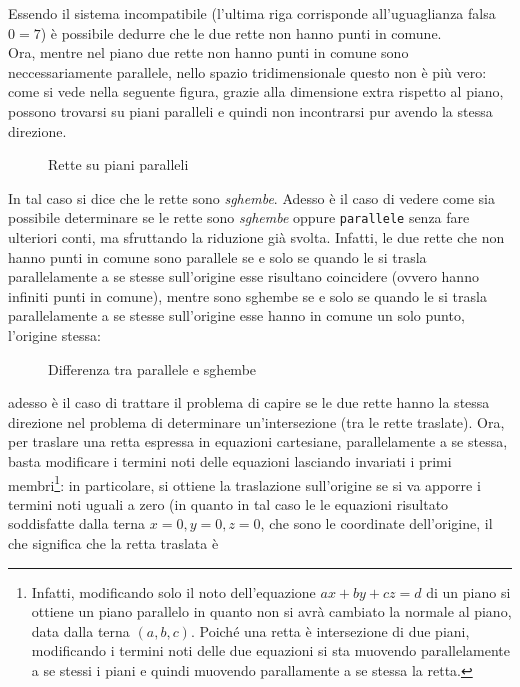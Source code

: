 Essendo il sistema incompatibile (l'ultima riga corrisponde all'uguaglianza falsa $0=7$) è possibile
dedurre che le due rette non hanno punti in comune.\\
Ora, mentre nel piano due rette non hanno punti in comune sono neccessariamente parallele, nello spazio
tridimensionale questo non è più vero: come si vede nella seguente figura, grazie alla dimensione extra
rispetto al piano, possono trovarsi su piani paralleli e quindi non incontrarsi pur avendo la stessa
direzione.
\clearpage
\begin{figure}[ht!]
  \centering
  
  \caption{Rette su piani paralleli}
  \label{fig:rettpar}
\end{figure}

In tal caso si dice che le rette sono \textit{sghembe}. Adesso è il caso di vedere come sia possibile
determinare se le rette sono \textit{sghembe} oppure \texttt{parallele} senza fare ulteriori conti, 
ma sfruttando la riduzione già svolta. Infatti, le due rette che non hanno punti in comune sono
parallele se e solo se quando le si trasla parallelamente a se stesse sull'origine esse risultano
coincidere (ovvero hanno infiniti punti in comune), mentre sono sghembe se e solo se quando le
si trasla parallelamente a se stesse sull'origine esse hanno in comune un solo punto, l'origine stessa:
\begin{figure}[ht!]
  \centering
  
  \caption{Differenza tra parallele e sghembe}
  \label{fig:retteparesghembe}
\end{figure}
adesso è il caso di trattare il problema di capire se le due rette hanno
la stessa direzione nel problema di determinare un'intersezione (tra le
rette traslate). Ora, per traslare una retta espressa in equazioni
cartesiane, parallelamente a se stessa, basta modificare i termini noti
delle equazioni lasciando invariati i primi membri\footnote{Infatti,
  modificando solo il noto dell'equazione $ax+by+cz=d$ di un piano si
  ottiene un piano parallelo in quanto non si avrà cambiato la normale al
  piano, data dalla terna $(a,b,c)$. Poiché una retta è intersezione di due
  piani, modificando i termini noti delle due equazioni si sta muovendo
  parallelamente a se stessi i piani e quindi muovendo parallamente a se
  stessa la retta.}: in particolare, si ottiene la traslazione sull'origine
se si va apporre i termini noti uguali a zero (in quanto in tal caso le
le equazioni risultato soddisfatte dalla terna $x=0,y=0,z=0$, che sono le
coordinate dell'origine, il che significa che la retta traslata è
